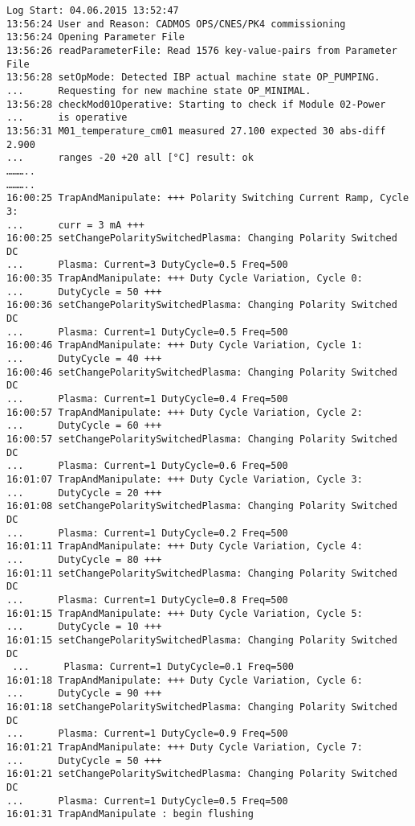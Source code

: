 \begin{small}
\begin{verbatim}
Log Start: 04.06.2015 13:52:47
13:56:24 User and Reason: CADMOS OPS/CNES/PK4 commissioning
13:56:24 Opening Parameter File
13:56:26 readParameterFile: Read 1576 key-value-pairs from Parameter File
13:56:28 setOpMode: Detected IBP actual machine state OP_PUMPING.
...      Requesting for new machine state OP_MINIMAL.
13:56:28 checkMod01Operative: Starting to check if Module 02-Power
...      is operative
13:56:31 M01_temperature_cm01 measured 27.100 expected 30 abs-diff 2.900
...      ranges -20 +20 all [°C] result: ok
………..
………..
16:00:25 TrapAndManipulate: +++ Polarity Switching Current Ramp, Cycle 3:
...      curr = 3 mA +++
16:00:25 setChangePolaritySwitchedPlasma: Changing Polarity Switched DC
...      Plasma: Current=3 DutyCycle=0.5 Freq=500
16:00:35 TrapAndManipulate: +++ Duty Cycle Variation, Cycle 0:
...      DutyCycle = 50 +++
16:00:36 setChangePolaritySwitchedPlasma: Changing Polarity Switched DC
...      Plasma: Current=1 DutyCycle=0.5 Freq=500
16:00:46 TrapAndManipulate: +++ Duty Cycle Variation, Cycle 1:
...      DutyCycle = 40 +++
16:00:46 setChangePolaritySwitchedPlasma: Changing Polarity Switched DC
...      Plasma: Current=1 DutyCycle=0.4 Freq=500
16:00:57 TrapAndManipulate: +++ Duty Cycle Variation, Cycle 2:
...      DutyCycle = 60 +++
16:00:57 setChangePolaritySwitchedPlasma: Changing Polarity Switched DC
...      Plasma: Current=1 DutyCycle=0.6 Freq=500
16:01:07 TrapAndManipulate: +++ Duty Cycle Variation, Cycle 3:
...      DutyCycle = 20 +++
16:01:08 setChangePolaritySwitchedPlasma: Changing Polarity Switched DC
...      Plasma: Current=1 DutyCycle=0.2 Freq=500
16:01:11 TrapAndManipulate: +++ Duty Cycle Variation, Cycle 4:
...      DutyCycle = 80 +++
16:01:11 setChangePolaritySwitchedPlasma: Changing Polarity Switched DC
...      Plasma: Current=1 DutyCycle=0.8 Freq=500
16:01:15 TrapAndManipulate: +++ Duty Cycle Variation, Cycle 5:
...      DutyCycle = 10 +++
16:01:15 setChangePolaritySwitchedPlasma: Changing Polarity Switched DC
 ...      Plasma: Current=1 DutyCycle=0.1 Freq=500
16:01:18 TrapAndManipulate: +++ Duty Cycle Variation, Cycle 6:
...      DutyCycle = 90 +++
16:01:18 setChangePolaritySwitchedPlasma: Changing Polarity Switched DC
...      Plasma: Current=1 DutyCycle=0.9 Freq=500
16:01:21 TrapAndManipulate: +++ Duty Cycle Variation, Cycle 7:
...      DutyCycle = 50 +++
16:01:21 setChangePolaritySwitchedPlasma: Changing Polarity Switched DC
...      Plasma: Current=1 DutyCycle=0.5 Freq=500
16:01:31 TrapAndManipulate : begin flushing

\end{verbatim}
\end{small}
